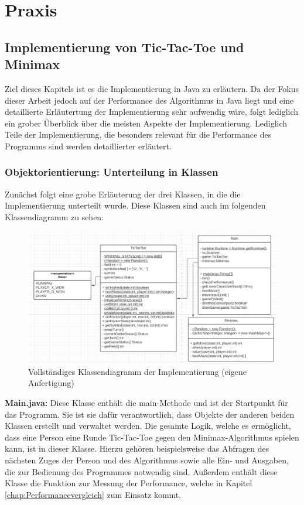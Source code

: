 \chapter{Praxis}

\section{Implementierung von Tic-Tac-Toe und Minimax}
Ziel dieses Kapitels ist es die Implementierung in Java zu erläutern. Da der Fokus dieser Arbeit jedoch auf der Performance
des Algorithmus in Java liegt und eine detaillierte Erläutertung der Implementierung sehr aufwendig wäre, folgt lediglich
ein grober Überblick über die meisten Aspekte der Implementierung. Lediglich Teile der Implementierung, die besonders relevant
für die Performance des Programms sind werden detaillierter erläutert. 

\subsection{Objektorientierung: Unterteilung in Klassen}
Zunächst folgt eine grobe Erläuterung der drei Klassen, in die die Implementierung unterteilt wurde.
Diese Klassen sind auch im folgenden Klassendiagramm zu sehen:
\begin{figure}[H]
    \centering
    \includegraphics[scale=0.3]{img/uml_diagram.png}
    \caption[Vollständiges Klassendiagramm der Implementierung]{Vollständiges Klassendiagramm der Implementierung (eigene Anfertigung)} %
    \label{fig:uml}
\end{figure}

\textbf{Main.java:} Diese Klasse enthält die main-Methode und ist der Startpunkt für das Programm. Sie ist sie dafür
verantwortlich, dass Objekte der anderen beiden Klassen erstellt und verwaltet werden. Die gesamte Logik, welche es ermöglicht, dass 
eine Person eine Runde Tic-Tac-Toe gegen den Minimax-Algorithmus spielen kann, ist in dieser Klasse. Hierzu gehören beispielsweise 
das Abfragen des nächsten Zuges der Person und des Algorithmus sowie alle Ein- und Ausgaben, die zur Bedienung des Programmes notwendig sind. 
Außerdem enthält diese Klasse die Funktion zur Messung der Performance, welche in Kapitel \ref{chap:Performancevergleich} zum Einsatz kommt.

